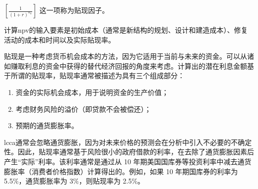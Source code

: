 \medskip
$\left[ \frac{1}{(1+r)^{n_k}}\right]$ 这一项称为贴现因子。

\medskip
计算\acrlong*{npv}的输入要素是初始成本（通常是新结构的规划、设计和建造成本）、修复活动的成本和时间以及实际贴现率。

贴现是一种考虑货币机会成本的方法，因为它适用于当前与未来的资金。可以从诸如赚取利息的资金中获得的替代经济回报的角度来考虑。计算出的潜在利息金额基于所谓的贴现率，贴现率通常被描述为具有三个组成部分：

\begin{enumerate}
  \item 资金的实际机会成本，用于说明资金的生产价值；
  \item 考虑财务风险的溢价（即贷款不会被偿还）；
  \item 预期的通货膨胀率。
\end{enumerate}

\acrlong*{lcca}通常会忽略通货膨胀，因为对未来价格的预测会在分析中引入不必要的不确定性。因此，贴现率通常基于风险很小的政府借款的利率，在去除了通货膨胀因素后产生“实际”利率。该利率通常是通过从 10 年期美国国库券等投资利率中减去通货膨胀率（消费者价格指数）计算得出的。例如，如果 10 年期国库券的利率为 5.5\%，通货膨胀率为 3\%，则贴现率为 2.5\%。

